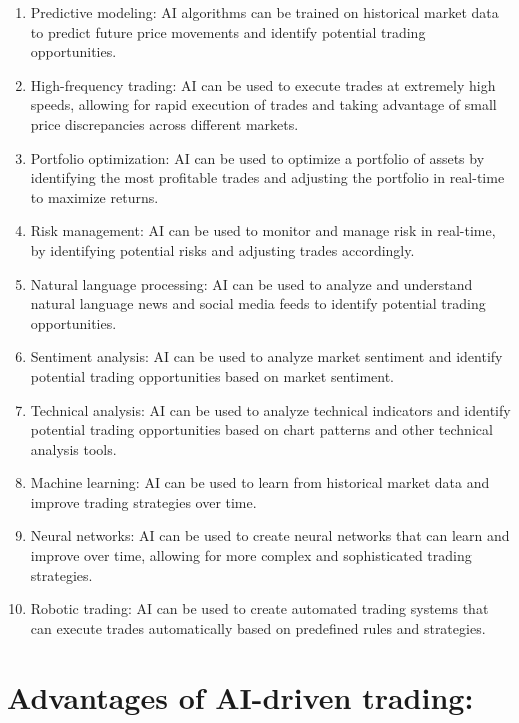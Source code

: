 \documentclass[
  letterpaper,
  DIV=11,
  numbers=noendperiod]{scrreprt}
\begin{document}
\begin{enumerate}
\def\labelenumi{\arabic{enumi}.}
\item
  Predictive modeling: AI algorithms can be trained on historical market
  data to predict future price movements and identify potential trading
  opportunities.
\item
  High-frequency trading: AI can be used to execute trades at extremely
  high speeds, allowing for rapid execution of trades and taking
  advantage of small price discrepancies across different markets.
\item
  Portfolio optimization: AI can be used to optimize a portfolio of
  assets by identifying the most profitable trades and adjusting the
  portfolio in real-time to maximize returns.
\item
  Risk management: AI can be used to monitor and manage risk in
  real-time, by identifying potential risks and adjusting trades
  accordingly.
\item
  Natural language processing: AI can be used to analyze and understand
  natural language news and social media feeds to identify potential
  trading opportunities.
\item
  Sentiment analysis: AI can be used to analyze market sentiment and
  identify potential trading opportunities based on market sentiment.
\item
  Technical analysis: AI can be used to analyze technical indicators and
  identify potential trading opportunities based on chart patterns and
  other technical analysis tools.
\item
  Machine learning: AI can be used to learn from historical market data
  and improve trading strategies over time.
\item
  Neural networks: AI can be used to create neural networks that can
  learn and improve over time, allowing for more complex and
  sophisticated trading strategies.
\item
  Robotic trading: AI can be used to create automated trading systems
  that can execute trades automatically based on predefined rules and
  strategies.
\end{enumerate}

\section*{Advantages of AI-driven
trading:}\label{advantages-of-ai-driven-trading}
\end{document}
